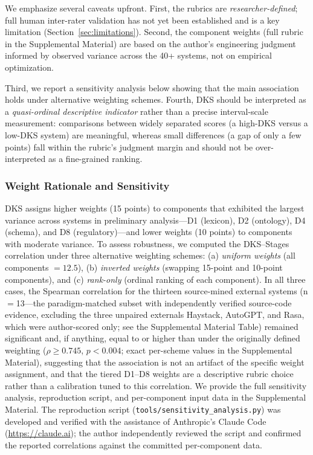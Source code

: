 \documentclass[fleqn,10pt,lineno]{wlpeerj}
\begin{document}
We emphasize several caveats upfront. First, the rubrics are \textit{researcher-defined}; full human inter-rater validation has not yet been established and is a key limitation (Section~\ref{sec:limitations}). Second, the component weights (full rubric in the Supplemental Material) are based on the author's engineering judgment informed by observed variance across the 40+ systems, not on empirical optimization.

Third, we report a sensitivity analysis below showing that the main association holds under alternative weighting schemes. Fourth, DKS should be interpreted as a \textit{quasi-ordinal descriptive indicator} rather than a precise interval-scale measurement: comparisons between widely separated scores (a high-DKS versus a low-DKS system) are meaningful, whereas small differences (a gap of only a few points) fall within the rubric's judgment margin and should not be over-interpreted as a fine-grained ranking.

\subsubsection{Weight Rationale and Sensitivity}

DKS assigns higher weights (15 points) to components that exhibited the largest variance across systems in preliminary analysis---D1 (lexicon), D2 (ontology), D4 (schema), and D8 (regulatory)---and lower weights (10 points) to components with moderate variance. To assess robustness, we computed the DKS--Stages correlation under three alternative weighting schemes: (a) \textit{uniform weights} (all components $= 12.5$), (b) \textit{inverted weights} (swapping 15-point and 10-point components), and (c) \textit{rank-only} (ordinal ranking of each component). In all three cases, the Spearman correlation for the thirteen source-mined external systems (n$=$13---the paradigm-matched subset with independently verified source-code evidence, excluding the three unpaired externals Haystack, AutoGPT, and Rasa, which were author-scored only; see the Supplemental Material Table) remained significant and, if anything, equal to or higher than under the originally defined weighting ($\rho \geq 0.745$, $p < 0.004$; exact per-scheme values in the Supplemental Material), suggesting that the association is not an artifact of the specific weight assignment, and that the tiered D1--D8 weights are a descriptive rubric choice rather than a calibration tuned to this correlation. We provide the full sensitivity analysis, reproduction script, and per-component input data in the Supplemental Material. The reproduction script (\texttt{tools/sensitivity\_analysis.py}) was developed and verified with the assistance of Anthropic's Claude Code (\url{https://claude.ai}); the author independently reviewed the script and confirmed the reported correlations against the committed per-component data.
\end{document}

